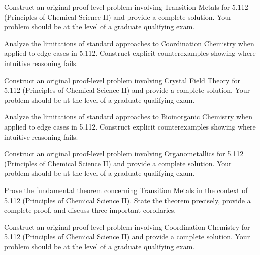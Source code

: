 \documentclass[12pt,a4paper]{exam}
\begin{document}
\begin{questions}

\question[5]
Construct an original proof-level problem involving Transition Metals for 5.112 (Principles of Chemical Science II) and provide a complete solution. Your problem should be at the level of a graduate qualifying exam.

\vspace{0.3cm}

\question[4]
Analyze the limitations of standard approaches to Coordination Chemistry when applied to edge cases in 5.112. Construct explicit counterexamples showing where intuitive reasoning fails.

\vspace{0.3cm}

\question[3]
Construct an original proof-level problem involving Crystal Field Theory for 5.112 (Principles of Chemical Science II) and provide a complete solution. Your problem should be at the level of a graduate qualifying exam.

\vspace{0.3cm}

\question[2]
Analyze the limitations of standard approaches to Bioinorganic Chemistry when applied to edge cases in 5.112. Construct explicit counterexamples showing where intuitive reasoning fails.

\vspace{0.3cm}

\question[6]
Construct an original proof-level problem involving Organometallics for 5.112 (Principles of Chemical Science II) and provide a complete solution. Your problem should be at the level of a graduate qualifying exam.

\vspace{0.3cm}

\question[4]
Prove the fundamental theorem concerning Transition Metals in the context of 5.112 (Principles of Chemical Science II). State the theorem precisely, provide a complete proof, and discuss three important corollaries.

\vspace{0.3cm}

\question[6]
Construct an original proof-level problem involving Coordination Chemistry for 5.112 (Principles of Chemical Science II) and provide a complete solution. Your problem should be at the level of a graduate qualifying exam.

\vspace{0.3cm}


\end{questions}
\end{document}

